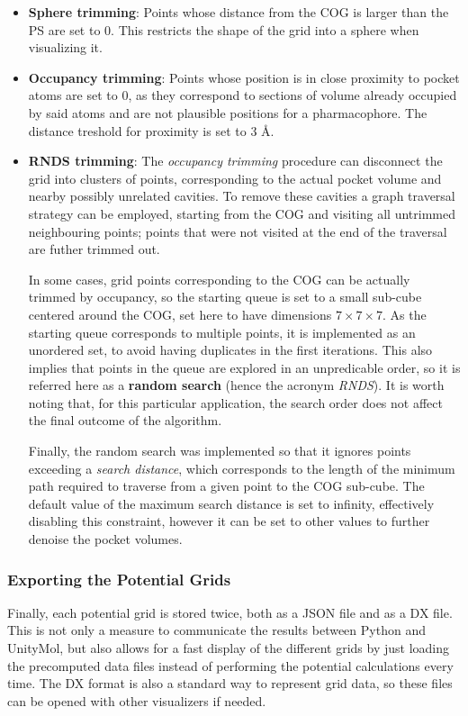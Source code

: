       \begin{itemize}
        \item \textbf{Sphere trimming}: Points whose distance from the COG is larger than the PS are set to $0$. This restricts the shape of the grid into a sphere when visualizing it.

        \item \textbf{Occupancy trimming}: Points whose position is in close proximity to pocket atoms are set to $0$, as they correspond to sections of volume already occupied by said atoms and are not plausible positions for a pharmacophore. The distance treshold for proximity is set to {3 \AA}.

        \item \textbf{RNDS trimming}: The \textit{occupancy trimming} procedure can disconnect the grid into clusters of points, corresponding to the actual pocket volume and nearby possibly unrelated cavities. To remove these cavities a graph traversal strategy can be employed, starting from the COG and visiting all untrimmed neighbouring points; points that were not visited at the end of the traversal are futher trimmed out.

        In some cases, grid points corresponding to the COG can be actually trimmed by occupancy, so the starting queue is set to a small sub-cube centered around the COG, set here to have dimensions $7 \times 7 \times 7$. As the starting queue corresponds to multiple points, it is implemented as an unordered set, to avoid having duplicates in the first iterations. This also implies that points in the queue are explored in an unpredicable order, so it is referred here as a \textbf{random search} (hence the acronym \textit{RNDS}). It is worth noting that, for this particular application, the search order does not affect the final outcome of the algorithm.

        Finally, the random search was implemented so that it ignores points exceeding a \textit{search distance}, which corresponds to the length of the minimum path required to traverse from a given point to the COG sub-cube. The default value of the maximum search distance is set to infinity, effectively disabling this constraint, however it can be set to other values to further denoise the pocket volumes.

      \end{itemize}

    \subsubsection{Exporting the Potential Grids}
      Finally, each potential grid is stored twice, both as a JSON file and as a DX file. This is not only a measure to communicate the results between Python and UnityMol, but also allows for a fast display of the different grids by just loading the precomputed data files instead of performing the potential calculations every time. The DX format is also a standard way to represent grid data, so these files can be opened with other visualizers if needed.

